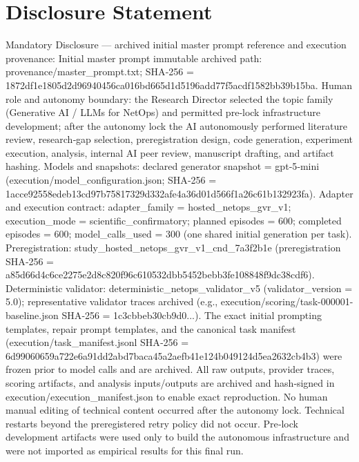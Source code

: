 \documentclass[conference]{IEEEtran}
\begin{document}
\section*{Disclosure Statement}
Mandatory Disclosure --- archived initial master prompt reference and execution provenance: Initial master prompt immutable archived path: provenance/master\_prompt.txt; SHA‑256 = 1872df1e1805d2d96940456ca016bd665d1d5196add77f5acdf1582bb39b15ba. Human role and autonomy boundary: the Research Director selected the topic family (Generative AI / LLMs for NetOps) and permitted pre‑lock infrastructure development; after the autonomy lock the AI autonomously performed literature review, research‑gap selection, preregistration design, code generation, experiment execution, analysis, internal AI peer review, manuscript drafting, and artifact hashing. Models and snapshots: declared generator snapshot = gpt‑5‑mini (execution/model\_configuration.json; SHA‑256 = 1acce92558edeb13cd97b75817329d332afe4a36d01d566f1a26c61b132923fa). Adapter and execution contract: adapter\_family = hosted\_netops\_gvr\_v1; execution\_mode = scientific\_confirmatory; planned episodes = 600; completed episodes = 600; model\_calls\_used = 300 (one shared initial generation per task). Preregistration: study\_hosted\_netops\_gvr\_v1\_cnd\_7a3f2b1e (preregistration SHA‑256 = a85d66d4c6ce2275e2d8c820f96c610532dbb5452bebb3fe108848f9dc38cdf6). Deterministic validator: deterministic\_netops\_validator\_v5 (validator\_version = 5.0); representative validator traces archived (e.g., execution/scoring/task-000001-baseline.json SHA‑256 = 1c3cbbeb30cb9d0...). The exact initial prompting templates, repair prompt templates, and the canonical task manifest (execution/task\_manifest.jsonl SHA‑256 = 6d99060659a722e6a91dd2abd7baca45a2aefb41e124b049124d5ea2632cb4b3) were frozen prior to model calls and are archived. All raw outputs, provider traces, scoring artifacts, and analysis inputs/outputs are archived and hash‑signed in execution/execution\_manifest.json to enable exact reproduction. No human manual editing of technical content occurred after the autonomy lock. Technical restarts beyond the preregistered retry policy did not occur. Pre‑lock development artifacts were used only to build the autonomous infrastructure and were not imported as empirical results for this final run.
\end{document}
